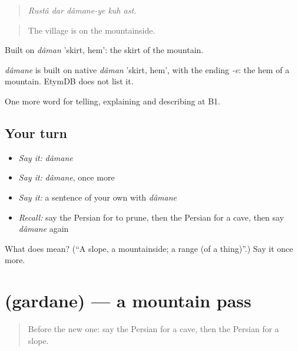 \begin{quote}
\emph{Rustâ dar dâmane-ye kuh ast.}
\end{quote}

\begin{quote}
The village is on the mountainside.
\end{quote}

Built on \emph{dâman} 'skirt, hem': the skirt of the mountain.

\begin{cousinweb}
\emph{dâmane} is built on native \emph{dâman} 'skirt, hem', with the ending \emph{-e}: the hem of a mountain. EtymDB does not list it.
\end{cousinweb}

\begin{grammarlens}[title={What you've built}]
One more word for telling, explaining and describing at B1.
\end{grammarlens}

\subsection*{Your turn}
\begin{itemize}
\raggedright
  \item \emph{Say it:} \emph{dâmane}
  \item \emph{Say it:} \emph{dâmane}, once more
  \item \emph{Say it:} a sentence of your own with \emph{dâmane}
  \item \emph{Recall:} say the Persian for to prune, then the Persian for a cave, then say \emph{dâmane} again
\end{itemize}

\begin{tcolorbox}[breakable,colback=teal!4,colframe=teal!35!black,title={Before you move on}]
What does  mean? (\textquotedblleft{}A slope, a mountainside; a range (of a thing)\textquotedblright{}.) Say it once more.
\end{tcolorbox}
\section[\texorpdfstring{\fa{گردنه} (gardane)}{گردنه (gardane)}]{ (gardane) — a mountain pass}

\label{lesson:FA-C468-gardane}



\begin{quote}
Before the new one: say the Persian for a cave, then the Persian for a slope.
\end{quote}

